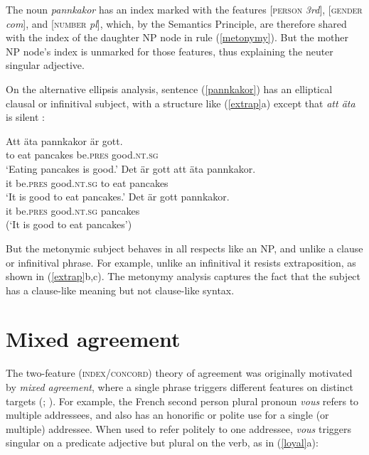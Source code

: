 \documentclass[output=paper]{langsci/langscibook}
\begin{document}
\noindent
The noun \textit{pannkakor} has an index marked with the features [\textsc{person}  \textit{3rd}], [\textsc{gender} \textit{com}], and [\textsc{number} \textit{pl}], which, by the Semantics Principle, are therefore shared with the index of the daughter NP node in rule (\ref{metonymy}).  But the mother NP node's index is unmarked for those features, thus explaining the neuter singular adjective.    

On the alternative ellipsis analysis, sentence (\ref{pannkakor}) has an elliptical clausal or infinitival subject, with a structure like (\ref{extrap}a) except that \textit{att \"{a}ta} is silent \citep{Faarlund:1977, Enger:2004,Josefsson:2009}:  

\begin{exe} 
\ex\label{extrap}
\begin{xlist}
\ex 
\gll   Att äta pannkakor är gott. \\
to eat pancakes be.\textsc{pres} good.\textsc{nt.sg} \\
\glt ‘Eating pancakes is good.’
\ex 
\gll Det är gott att äta pannkakor. \\
it be.\textsc{pres} good.\textsc{nt.sg}  to eat pancakes \\
\glt `It is good to eat pancakes.'
\ex 
\gll  *Det är gott pannkakor.\\
 it be.\textsc{pres} good.\textsc{nt.sg}  pancakes \\
\glt  (`It is good  to eat pancakes')
\end{xlist}
\end{exe}

\noindent
But the metonymic subject behaves in all respects like an NP, and unlike a clause or infinitival phrase.  For example, unlike an infinitival it resists extraposition, as shown in (\ref{extrap}b,c).  The metonymy analysis captures the fact that the subject has a clause-like meaning but not clause-like syntax.  
  


\section{Mixed agreement}
\label{mismatch}
 

The two-feature (\textsc{index/concord}) theory of agreement was originally motivated by  \textit{mixed agreement}, where a single phrase triggers different features on distinct targets (\citet[ch.\ 2]{Pollard+Sag:1994}; \citet{kathol:1999}).  For example, the French second person plural pronoun \textit{vous} refers to multiple addressees, and also has an honorific or polite use for a single (or multiple) addressee.  When used to refer politely to one addressee, \textit{vous} triggers singular on a predicate adjective but plural on the verb, as in (\ref{loyal}a):
\end{document}
